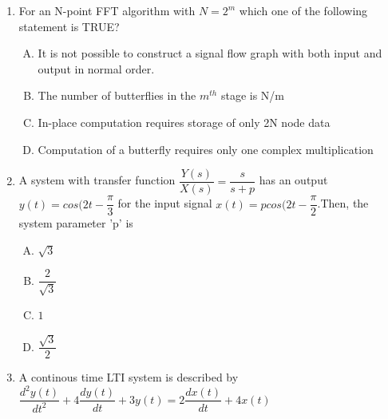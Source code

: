 \documentclass[journal,12pt,twocolumn]{IEEEtran}
\begin{document}
\begin{enumerate}
\begin{enumerate}[(A)]
\end{enumerate}

\item For an N-point FFT algorithm with $N=2^{m}$ which one of the following statement is TRUE?

\begin{enumerate}[(A)]

\setlength\itemsep{2em}

\item It is not possible to construct a signal flow graph with both input and output in normal order.
\item The number of butterflies in the $m^{th}$ stage is N/m
\item In-place computation requires storage of only 2N node data
\item Computation of a butterfly requires only one complex multiplication


\end{enumerate}


\item A system with transfer function $\dfrac{Y(s)}{X(s)}=\dfrac{s}{s+p}$ has an output $y(t)=cos(2t-\dfrac{\pi}{3}$ for the input signal $x(t)=p cos(2t-\dfrac{\pi}{2}$.Then, the system parameter 'p' is


\begin{enumerate}[(A)]

\setlength\itemsep{2em}

\item $\sqrt{3}$
\item $\dfrac{2}{\sqrt{3}}$
\item $1$
\item $\dfrac{\sqrt{3}}{2}$

\end{enumerate}

\item A continous time LTI system is described by $\dfrac{d^{2}y(t)}{dt^{2}}+4\dfrac{dy(t)}{dt}+3y(t)=2\dfrac{dx(t)}{dt}+4x(t)$

\begin{enumerate}[(A)]


\end{enumerate}
\end{enumerate}
\end{document}

